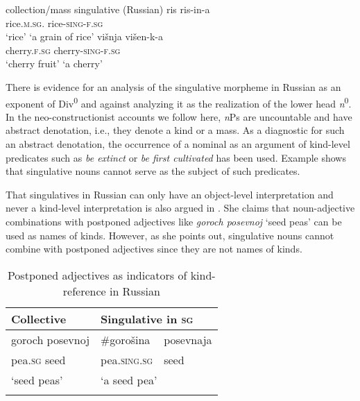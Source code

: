\documentclass[output=paper,colorlinks,citecolor=brown,
]{langscibook}
\begin{document}
\ea\label{ex:24} \hspace{.5cm} collection/mass \phantom{I} singulative \hfill (Russian)
\ea\label{ex:24a} 
\gll  ris \phantom{XXXXi} ris-in-a \\
rice.\textsc{m.sg.} {} rice-\textsc{sing-f.sg} \\ 
\glt `rice' \phantom{XXXXXXXi} `a grain of rice'
 \ex\label{ex:24b}
\gll višnja \phantom{XXXi} višen-k-a \\
cherry.\textsc{f.sg} {} cherry-\textsc{sing-f.sg} \\
\glt `cherry fruit' \phantom{XXi} `a cherry'
\z\z

\noindent There is evidence for an analysis of the singulative morpheme in Russian as an exponent of Div\textsuperscript{0} and against analyzing it as the realization of the lower head \textit{n}\textsuperscript{0}. In the neo-constructionist accounts we follow here, \textit{n}Ps are uncountable and have abstract denotation, i.e., they denote a kind or a mass. As a diagnostic for such an abstract denotation, the occurrence of a nominal as an argument of kind-level predicates such as \textit{be extinct} or \textit{be first cultivated} has been used. Example  shows that singulative nouns cannot serve as the subject of such predicates.

\label{ex:25}
\z

\noindent That singulatives in Russian can only have an object-level interpretation and never a kind-level interpretation is also argued in \citet[329]{Trugman2013}. She claims that noun-adjective combinations with postponed adjectives like \textit{goroch posevnoj} `seed peas' can be used as names of kinds. However, as she points out, singulative nouns cannot combine with postponed adjectives since they are not names of kinds. 

\begin{table}
\centering
\begin{tabular}{lll} 
\lsptoprule
Collective & \multicolumn{2}{l}{Singulative in \textsc{sg}} \\
\midrule
goroch posevnoj & \#gorošina & posevnaja \\ 
pea.\textsc{sg} seed & \phantom{\#}pea.\textsc{sing.sg} & seed \\ 
`seed peas' & \multicolumn{2}{l}{`a seed pea'} \\ 
\lspbottomrule
\end{tabular}
\caption{Postponed adjectives as indicators of kind-reference in Russian}
\label{tab:postponed_Rus}
\end{table}
\end{document}
